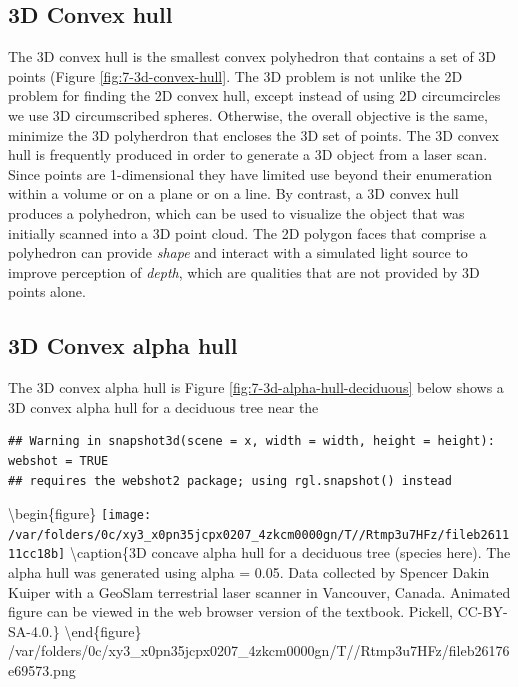 \documentclass[
]{book}
\begin{document}
\hypertarget{d-convex-hull}{%
\subsection{3D Convex hull}\label{d-convex-hull}}

The 3D convex hull is the smallest convex polyhedron that contains a set of 3D points (Figure \ref{fig:7-3d-convex-hull}. The 3D problem is not unlike the 2D problem for finding the 2D convex hull, except instead of using 2D circumcircles we use 3D circumscribed spheres. Otherwise, the overall objective is the same, minimize the 3D polyherdron that encloses the 3D set of points. The 3D convex hull is frequently produced in order to generate a 3D object from a laser scan. Since points are 1-dimensional they have limited use beyond their enumeration within a volume or on a plane or on a line. By contrast, a 3D convex hull produces a polyhedron, which can be used to visualize the object that was initially scanned into a 3D point cloud. The 2D polygon faces that comprise a polyhedron can provide \emph{shape} and interact with a simulated light source to improve perception of \emph{depth}, which are qualities that are not provided by 3D points alone.

\hypertarget{d-convex-alpha-hull}{%
\subsection{3D Convex alpha hull}\label{d-convex-alpha-hull}}

The 3D convex alpha hull is Figure \ref{fig:7-3d-alpha-hull-deciduous} below shows a 3D convex alpha hull for a deciduous tree near the

\begin{verbatim}
## Warning in snapshot3d(scene = x, width = width, height = height): webshot = TRUE
## requires the webshot2 package; using rgl.snapshot() instead
\end{verbatim}

\textbackslash begin\{figure\}
\texttt{[image: /var/folders/0c/xy3\_x0pn35jcpx0207\_4zkcm0000gn/T//Rtmp3u7HFz/fileb261111cc18b]} \textbackslash caption\{3D concave alpha hull for a deciduous tree (species here). The alpha hull was generated using alpha = 0.05. Data collected by Spencer Dakin Kuiper with a GeoSlam terrestrial laser scanner in Vancouver, Canada. Animated figure can be viewed in the web browser version of the textbook. Pickell, CC-BY-SA-4.0.\}\label{fig:7-3d-alpha-hull-deciduous}
\textbackslash end\{figure\}
/var/folders/0c/xy3\_x0pn35jcpx0207\_4zkcm0000gn/T//Rtmp3u7HFz/fileb26176e69573.png
\end{document}
